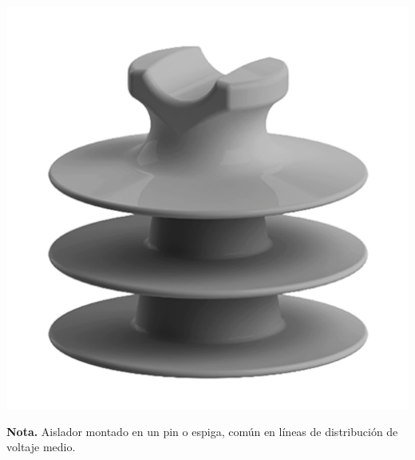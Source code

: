 \noindent %
\begin{minipage}[t]{0.48\textwidth} %
    \centering
    \includegraphics[width=\linewidth]{fotosherrajes/Aislador tipo pin.png}
    \footnotesize
    \raggedright
    \textbf{Nota.} Aislador montado en un pin o espiga, común en líneas de distribución de voltaje medio.
\end{minipage}%
\hfill%
